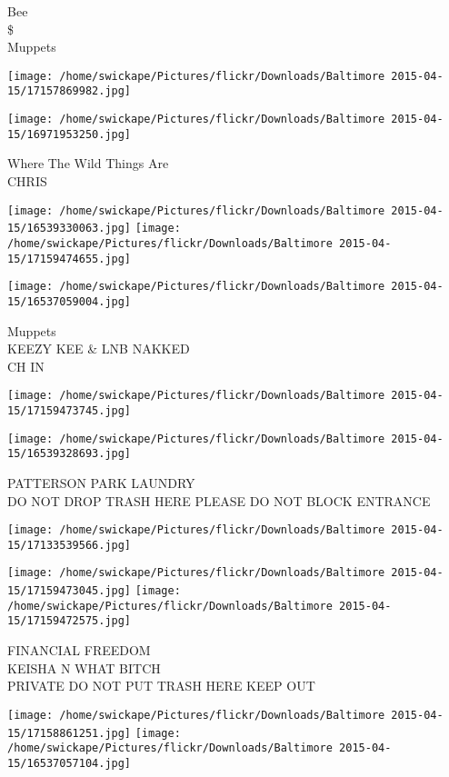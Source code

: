\documentclass[10pt,letterpaper]{article}
\begin{document}
Bee\\
\$\\
Muppets
\pagebreak

\texttt{[image: /home/swickape/Pictures/flickr/Downloads/Baltimore 2015-04-15/17157869982.jpg]}

\vspace{0.25in}
\texttt{[image: /home/swickape/Pictures/flickr/Downloads/Baltimore 2015-04-15/16971953250.jpg]}

Where The Wild Things Are\\
CHRIS
\pagebreak

\texttt{[image: /home/swickape/Pictures/flickr/Downloads/Baltimore 2015-04-15/16539330063.jpg]}
\texttt{[image: /home/swickape/Pictures/flickr/Downloads/Baltimore 2015-04-15/17159474655.jpg]}

\texttt{[image: /home/swickape/Pictures/flickr/Downloads/Baltimore 2015-04-15/16537059004.jpg]}

Muppets\\
KEEZY KEE \& LNB NAKKED\\
CH IN
\pagebreak

\texttt{[image: /home/swickape/Pictures/flickr/Downloads/Baltimore 2015-04-15/17159473745.jpg]}

\vspace{0.25in}
\texttt{[image: /home/swickape/Pictures/flickr/Downloads/Baltimore 2015-04-15/16539328693.jpg]}

PATTERSON PARK LAUNDRY\\
DO NOT DROP TRASH HERE PLEASE DO NOT BLOCK ENTRANCE
\pagebreak

\texttt{[image: /home/swickape/Pictures/flickr/Downloads/Baltimore 2015-04-15/17133539566.jpg]}

\vspace{0.25in}
\texttt{[image: /home/swickape/Pictures/flickr/Downloads/Baltimore 2015-04-15/17159473045.jpg]}
\texttt{[image: /home/swickape/Pictures/flickr/Downloads/Baltimore 2015-04-15/17159472575.jpg]}

FINANCIAL FREEDOM\\
KEISHA N WHAT BITCH\\
PRIVATE DO NOT PUT TRASH HERE KEEP OUT
\pagebreak

\texttt{[image: /home/swickape/Pictures/flickr/Downloads/Baltimore 2015-04-15/17158861251.jpg]}
\texttt{[image: /home/swickape/Pictures/flickr/Downloads/Baltimore 2015-04-15/16537057104.jpg]}
\end{document}
